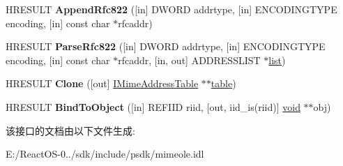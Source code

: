 \begin{DoxyCompactItemize}
\mbox{\label{interface_m_i_m_e_o_l_e_1_1_i_mime_address_table_ae03aff2941cceb96272dbdda9f04d8a3}} 
H\+R\+E\+S\+U\+LT {\bfseries Append\+Rfc822} (\mbox{[}in\mbox{]} D\+W\+O\+RD addrtype, \mbox{[}in\mbox{]} E\+N\+C\+O\+D\+I\+N\+G\+T\+Y\+PE encoding, \mbox{[}in\mbox{]} const char $\ast$rfcaddr)
\item 
\mbox{\label{interface_m_i_m_e_o_l_e_1_1_i_mime_address_table_a81b13e9285cff908020c5a35235e1b8c}} 
H\+R\+E\+S\+U\+LT {\bfseries Parse\+Rfc822} (\mbox{[}in\mbox{]} D\+W\+O\+RD addrtype, \mbox{[}in\mbox{]} E\+N\+C\+O\+D\+I\+N\+G\+T\+Y\+PE encoding, \mbox{[}in\mbox{]} const char $\ast$rfcaddr, \mbox{[}in, out\mbox{]} A\+D\+D\+R\+E\+S\+S\+L\+I\+ST $\ast$\hyperlink{classlist}{list})
\item 
\mbox{\label{interface_m_i_m_e_o_l_e_1_1_i_mime_address_table_a7c0a42c76b4e29aeacd9fd136facf909}} 
H\+R\+E\+S\+U\+LT {\bfseries Clone} (\mbox{[}out\mbox{]} \hyperlink{interface_m_i_m_e_o_l_e_1_1_i_mime_address_table}{I\+Mime\+Address\+Table} $\ast$$\ast$\hyperlink{structtable}{table})
\item 
\mbox{\label{interface_m_i_m_e_o_l_e_1_1_i_mime_address_table_a5b6e45cdd112a60bf95dcabbbef085d3}} 
H\+R\+E\+S\+U\+LT {\bfseries Bind\+To\+Object} (\mbox{[}in\mbox{]} R\+E\+F\+I\+ID riid, \mbox{[}out, iid\+\_\+is(riid)\mbox{]} \hyperlink{interfacevoid}{void} $\ast$$\ast$obj)
\end{DoxyCompactItemize}


该接口的文档由以下文件生成\+:\begin{DoxyCompactItemize}
\item 
E\+:/\+React\+O\+S-\/0../sdk/include/psdk/mimeole.\+idl\end{DoxyCompactItemize}

